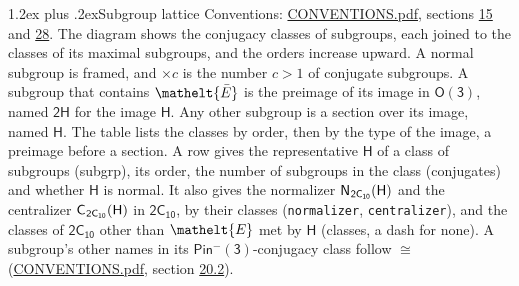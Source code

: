 \documentclass[10pt,a4paper]{article}
\makeatletter
\renewcommand\section{\@startsection{section}{1}{\z@}{-3ex plus -1ex minus -.2ex}%
  {1.2ex plus .2ex}{\normalfont\large\sffamily\bfseries\color{parttitle}}}
\numberwithin{equation}{section}
\newcommand{\eltfont}[1]{{\let\sigma\eltsigma\mathelt{#1}}}
\newcommand{\grp}[1]{\mathsf{#1}}
\newcommand{\cls}[1]{\eltfont{#1}}
\newcommand{\elt}[1]{\eltfont{#1}}
\newcommand{\samecls}{\cong}
\newcommand{\barred}[1]{\bar{#1}}
\newcommand{\hairsp}{\mkern1mu}
\makeatother
\begin{document}
\section{Subgroup lattice}\label{s:subgroups}
Conventions: \href{../../CONVENTIONS.pdf}{CONVENTIONS.pdf}, sections \href{../../../rotation/CONVENTIONS.pdf\#conv.15}{15} and \href{../../CONVENTIONS.pdf\#conv.28}{28}.
The diagram shows the conjugacy classes of subgroups, each joined to the classes of its maximal subgroups, and the orders increase upward. \label{n:index.conjugates.c}A normal subgroup is framed, and ${\times}c$ is the number $c > 1$ of conjugate subgroups. \label{n:group.H}A subgroup that contains $\elt{\barred{E}}$ is the preimage of its image in $\grp{O(3)}$, named $\grp{2H}$ for the image $\grp{H}$. Any other subgroup is a section over its image, named $\grp{H}$. The table lists the classes by order, then by the type of the image, a preimage before a section. \label{n:head.subgroup}\label{n:head.order}\label{n:head.conjugates}\label{n:head.normal}A row gives the representative $\grp{H}$ of a class of subgroups (subgrp), its order, the number of subgroups in the class (conjugates) and whether $\grp{H}$ is normal. \label{n:group.normalizer}\label{n:group.centralizer}\label{n:head.classes}It also gives the normalizer $\grp{N}_{\hairsp \grp{2C_{10}}}(\grp{H})$ and the centralizer $\grp{C}_{\hairsp \grp{2C_{10}}}(\grp{H})$ in $\grp{2C_{10}}$, by their classes (\texttt{normalizer}, \texttt{centralizer}), and the classes of $\grp{2C_{10}}$ other than $\cls{E}$ met by $\grp{H}$ (classes, a dash for none). A subgroup's other names in its \href{Pinminus3.pdf}{$\grp{Pin^{-}(3)}$}-conjugacy class follow $\samecls$ (\href{../../CONVENTIONS.pdf}{CONVENTIONS.pdf}, section \href{../../CONVENTIONS.pdf\#conv.20.2}{20.2}).
\begin{center}
\end{center}
\end{document}

